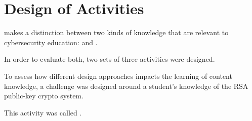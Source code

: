 























\providecommand{\heading}[1]{\section{#1}}







\providecommand{\subheading}[1]{\subsection{#1}}















\heading{Design of Activities}







    \textcite{R-Weiss} makes a distinction between two kinds of knowledge that are relevant to cybersecurity education:  and . %







In order to evaluate both, two sets of three activities were designed. %







To assess how different design approaches impacts the learning of content knowledge, a challenge was designed around a student's  knowledge of the RSA public-key crypto system. %







This activity was called . %







